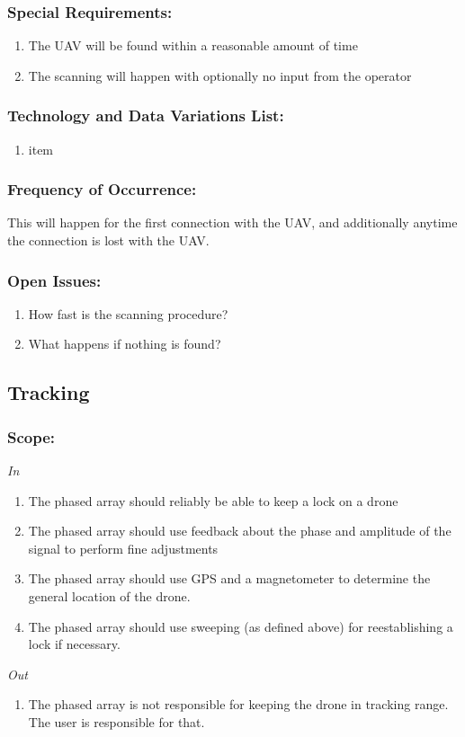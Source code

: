 \documentclass[ProductRequirements.tex]{subfiles}
\begin{document}
		\subsubsection*{Special Requirements:}
			\begin{enumerate}\itemsep1pt
				\item The UAV will be found within a reasonable amount of time
				\item The scanning will happen with optionally no input from the operator
			\end{enumerate}
		\subsubsection*{Technology and Data Variations List:}
			\begin{enumerate}\itemsep1pt
				\item item
			\end{enumerate}
		\subsubsection*{Frequency of Occurrence:}
			This will happen for the first connection with the UAV, and additionally anytime the connection is lost with the UAV.
		\subsubsection*{Open Issues:}
			\begin{enumerate}\itemsep1pt
				\item How fast is the scanning procedure?
				\item What happens if nothing is found?
			\end{enumerate}		
	
	\subsection{Tracking}
	\subsubsection*{Scope:}
	\textit{In}
	\begin{enumerate}
		\item The phased array should reliably be able to keep a lock on a drone
		\item The phased array should use feedback about the phase and amplitude of the signal to perform fine adjustments
		\item The phased array should use GPS and a magnetometer to determine the general location of the drone.
		\item The phased array should use sweeping (as defined above) for reestablishing a lock if necessary.
	\end{enumerate}
	\textit{Out}
	\begin{enumerate}
		\item The phased array is not responsible for keeping the drone in tracking range. The user is responsible for that.
	\end{enumerate}
\end{document}
